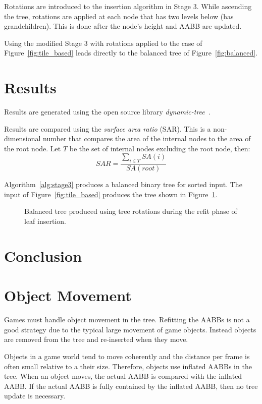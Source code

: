 \documentclass{article}
\begin{document}
Rotations are introduced to the insertion algorithm in Stage 3. While ascending the tree, rotations are applied at each node that has two levels below (has grandchildren). This is done after the node's height and AABB are updated.

Using the modified Stage 3 with rotations applied to the case of Figure~\ref{fig:tile_based} leads directly to the balanced tree of Figure~\ref{fig:balanced}.

\section{Results}
Results are generated using the open source library \emph{dynamic-tree}~\cite{Catto2019}.

Results are compared using the \emph{surface area ratio} (SAR). This is a non-dimensional number that compares the area of the internal nodes to the area of the root node. Let $T$ be the set of internal nodes excluding the root node, then:
\begin{equation}
	SAR = \frac{\sum_{i \in T} SA(i)}{SA(root)}
\end{equation}

Algorithm~\ref{alg:stage3} produces a balanced binary tree for sorted input. The input of Figure~\ref{fig:tile_based} produces the tree shown in Figure~\ref{fig:sort_balanced}.

\begin{figure}
	\begin{center}
		
	\end{center}
	\caption{Balanced tree produced using tree rotations during the refit phase of leaf insertion.}
	\label{fig:sort_balanced}
\end{figure}

\section{Conclusion}


\section{Object Movement}

Games must handle object movement in the tree. Refitting the AABBs is not a good strategy due to the typical large movement of game objects. Instead objects are removed from the tree and re-inserted when they move. 

Objects in a game world tend to move coherently and the distance per frame is often small relative to a their size. Therefore, objects use inflated AABBs in the tree. When an object moves, the actual AABB is compared with the inflated AABB. If the actual AABB is fully contained by the inflated AABB, then no tree update is necessary.
\end{document}
